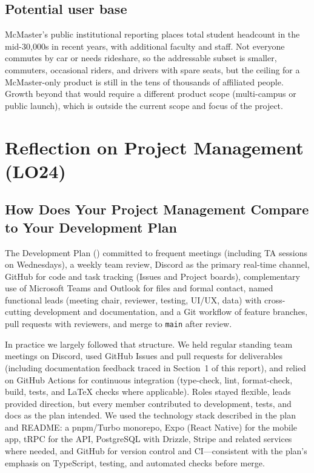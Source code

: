 \documentclass{article}
\begin{document}
\subsection{Potential user base}

\noindent McMaster's public institutional reporting places total student headcount in the mid-30,000s in recent years, with additional faculty and staff. Not everyone commutes by car or needs rideshare, so the addressable subset is smaller, commuters, occasional riders, and drivers with spare seats, but the ceiling for a McMaster-only product is still in the tens of thousands of affiliated people. Growth beyond that would require a different product scope (multi-campus or public launch), which is outside the current scope and focus of the project.

\section{Reflection on Project Management (LO24)}
\label{sec:lo24_project_management}

\subsection{How Does Your Project Management Compare to Your Development Plan}

The Development Plan () committed to frequent meetings (including TA sessions on Wednesdays), a weekly team review, Discord as the primary real-time channel, GitHub for code and task tracking (Issues and Project boards), complementary use of Microsoft Teams and Outlook for files and formal contact, named functional leads (meeting chair, reviewer, testing, UI/UX, data) with cross-cutting development and documentation, and a Git workflow of feature branches, pull requests with reviewers, and merge to \texttt{main} after review.

In practice we largely followed that structure. We held regular standing team meetings on Discord, used GitHub Issues and pull requests for deliverables (including documentation feedback traced in Section~1 of this report), and relied on GitHub Actions for continuous integration (type-check, lint, format-check, build, tests, and LaTeX checks where applicable). Roles stayed flexible, leads provided direction, but every member contributed to development, tests, and docs as the plan intended. We used the technology stack described in the plan and README: a pnpm/Turbo monorepo, Expo (React Native) for the mobile app, tRPC for the API, PostgreSQL with Drizzle, Stripe and related services where needed, and GitHub for version control and CI---consistent with the plan's emphasis on TypeScript, testing, and automated checks before merge.
\end{document}
